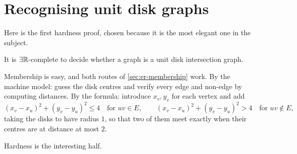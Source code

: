 \section{Recognising unit disk graphs}
\label{sec:udg-hardness}

Here is the first hardness proof, chosen because it is the most elegant one in
the subject.

\begin{theorem}\label{thm:udg}
It is $\exists\mathbb{R}$-complete to decide whether a graph is a unit disk intersection
graph.
\end{theorem}

Membership is easy, and both routes of \cref{sec:er-membership} work. By the
machine model: guess the disk centres and verify every edge and non-edge by
computing distances. By the formula: introduce $x_v, y_v$ for each vertex and
add
\[ (x_v-x_u)^2 + (y_v-y_u)^2 \le 4 \quad \text{for } uv \in E, \qquad
   (x_v-x_u)^2 + (y_v-y_u)^2 > 4 \quad \text{for } uv \notin E, \]
taking the disks to have radius $1$, so that two of them meet exactly when their
centres are at distance at most $2$.

Hardness is the interesting half.

